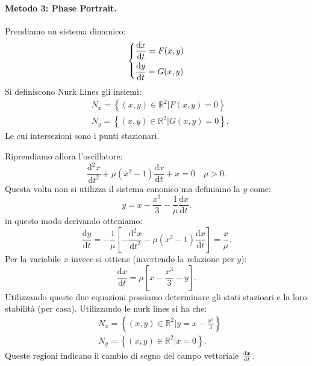 \paragraph{Metodo 3: Phase Portrait.}%
\begin{defn}
    Prendiamo un sistema dinamico:
    \[
    \begin{dcases}
	\frac{\text{d} x}{\text{d} t} = F(x, y) \\
	\frac{\text{d} y}{\text{d} t} = G(x, y) 
    \end{dcases}
    \]
    Si definiscono Nurk Lines gli insiemi:
    \[\begin{aligned}
	& N_x = \left\{(x, y) \in \mathbb{R}^2 | F(x, y) = 0\right\}\\
	& N_y = \left\{(x, y) \in \mathbb{R}^2 | G(x, y) = 0\right\}
    .\end{aligned}\]
    Le cui intersezioni sono i punti stazionari.
\end{defn}
\noindent
Riprendiamo allora l'oscillatore:
\[
    \frac{\text{d} ^2x}{\text{d} t^2} + \mu\left(x^2-1\right)\frac{\text{d} x}{\text{d} t} + x = 0 \quad  \mu  > 0
.\] 
Questa volta non si utilizza il sistema canonico ma definiamo la $y$ come:
\[
    y = x-\frac{x^3}{3} - \frac{1}{\mu}\frac{\text{d} x}{\text{d} t} 
.\] 
in questo modo derivando otteniamo:
\[
    \frac{\text{d} y}{\text{d} t} = -\frac{1}{\mu}\left[-\frac{\text{d} ^2x}{\text{d} t^2} - \mu (x^2-1) \frac{\text{d} x}{\text{d} t} \right] = \frac{x}{\mu}
.\] 
Per la variabile $x$  invece si ottiene (invertendo la relazione per $y$):
\[
    \frac{\text{d} x}{\text{d} t} = \mu\left[x-\frac{x^3}{3}-y\right]
.\] 
Utilizzando queste due equazioni possiamo determinare gli stati stazioari e la loro stabilità (per casa). Utilizzando le nurk lines si ha che:
\[\begin{aligned}
    &N_x = \left\{(x, y) \in \mathbb{R}^2| y = x-\frac{x^3}{3}\right\}\\
    &N_y = \left\{(x, y) \in \mathbb{R}^2| x = 0\right\}
.\end{aligned}\]
Queste regioni indicano il cambio di segno del campo vettoriale $\frac{\text{d} \boldsymbol{x}}{\text{d} t}$.
